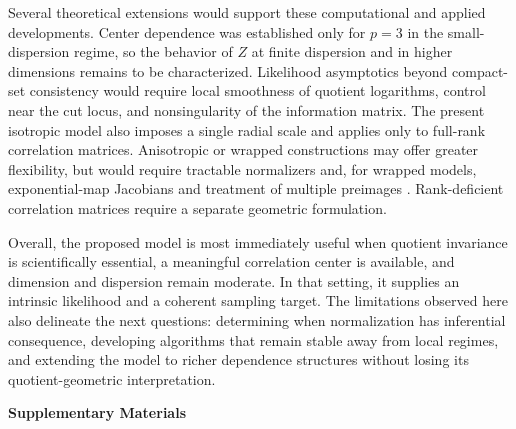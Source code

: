 \documentclass[
  12pt]{article}
\begin{document}
Several theoretical extensions would support these computational and applied developments. Center dependence was established only for $p=3$ in the small-dispersion regime, so the behavior of $Z$ at finite dispersion and in higher dimensions remains to be characterized. Likelihood asymptotics beyond compact-set consistency would require local smoothness of quotient logarithms, control near the cut locus, and nonsingularity of the information matrix. The present isotropic model also imposes a single radial scale and applies only to full-rank correlation matrices. Anisotropic or wrapped constructions may offer greater flexibility, but would require tractable normalizers and, for wrapped models, exponential-map Jacobians and treatment of multiple preimages \citep{thanwerdas_2021_GeodesicQuotientAffineMetrics}. Rank-deficient correlation matrices require a separate geometric formulation.

Overall, the proposed model is most immediately useful when quotient invariance is scientifically essential, a meaningful correlation center is available, and dimension and dispersion remain moderate. In that setting, it supplies an intrinsic likelihood and a coherent sampling target. The limitations observed here also delineate the next questions: determining when normalization has inferential consequence, developing algorithms that remain stable away from local regimes, and extending the model to richer dependence structures without losing its quotient-geometric interpretation.

\clearpage
{}

\label{supplementary-material}
\begin{center}
  {\LARGE\bfseries Supplementary Materials\par}
\end{center}
\bigskip

\appendix
\setcounter{figure}{0}
\setcounter{table}{0}
\setcounter{equation}{0}

\renewcommand{\thesection}{S\arabic{section}}
\renewcommand{\thesubsection}{S\arabic{section}.\arabic{subsection}}
\renewcommand{\thefigure}{S\arabic{figure}}
\renewcommand{\thetable}{S\arabic{table}}
\renewcommand{\theequation}{S\arabic{equation}}

\renewcommand{\theHsection}{supp.\arabic{section}}
\renewcommand{\theHsubsection}{supp.\arabic{section}.\arabic{subsection}}
\renewcommand{\theHfigure}{supp.figure.\arabic{figure}}
\renewcommand{\theHtable}{supp.table.\arabic{table}}
\renewcommand{\theHequation}{supp.equation.\arabic{equation}}
\end{document}
